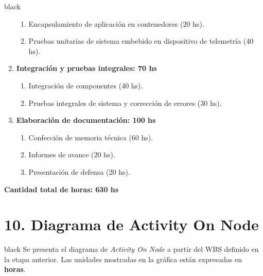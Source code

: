 \documentclass[
11pt, %
codirector, %
]{charter}
\begin{document}
\begin{consigna}{black}
\begin{enumerate}
\begin{enumerate}
	\item Encapsulamiento de aplicación en contenedores (20 hs).
	\item Pruebas unitarias de sistema embebido en dispositivo de telemetría (40 hs).
	\end{enumerate}
\item \textbf{Integración y pruebas integrales: 70 hs}
	\begin{enumerate}
	\item Integración de componentes (40 hs).
	\item Pruebas integrales de sistema y corrección de errores (30 hs).
	\end{enumerate}
\item \textbf{Elaboración de documentación: 100 hs}
	\begin{enumerate}
	\item Confección de memoria técnica (60 hs).
	\item Informes de avance (20 hs).
	\item Presentación de defensa (20 hs).
	\end{enumerate}
\end{enumerate}

\textbf{Cantidad total de horas: 630 hs}

\end{consigna}

\section{10. Diagrama de Activity On Node}
\label{sec:AoN}

\begin{consigna}{black}
Se presenta el diagrama de \textit{Activity On Node} a partir del WBS definido en la etapa anterior. 
Las unidades mostradas en la gráfica están expresadas en \textbf{horas}.



\end{consigna}

\end{document}
